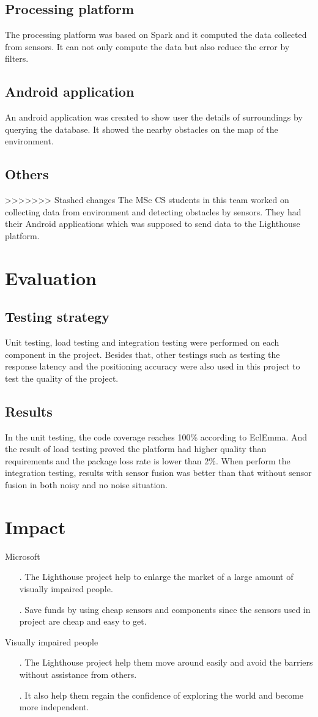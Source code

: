 \documentclass[prodmode,acmtosem]{acmsmall} %
\begin{document}
\subsection{Processing platform}
The processing platform was based on Spark and it computed the data collected from sensors. It can not only compute the data but also reduce the error by filters.
\subsection{Android application}
An android application was created to show user the details of surroundings by querying the database. It showed the nearby obstacles on the map of the environment.
\subsection{Others}
>>>>>>> Stashed changes
The MSc CS students in this team worked on collecting data from environment and detecting obstacles by sensors. They had their Android applications which was supposed to send data to the Lighthouse platform.
\section{Evaluation}
\subsection{Testing strategy}
Unit testing, load testing and integration testing were performed on each component in the project. Besides that, other testings such as testing the response latency and the positioning accuracy were also used in this project to test the quality of the project.
\subsection{Results}
In the unit testing, the code coverage reaches 100\% according to EclEmma. And the result of load testing proved the platform had higher quality than requirements and the package loss rate is lower than 2\%. When perform the integration testing, results with sensor fusion was better than that without sensor fusion in both noisy and no noise situation.
\section{Impact}
Microsoft
\begin{itemize}
\item[.] The Lighthouse project help to enlarge the market of a large amount of visually impaired people.
\item[.] Save funds by using cheap sensors and components since the sensors used in project are cheap and easy to get.
\end{itemize}
Visually impaired people
\begin{itemize}
\item[.] The Lighthouse project help them move around easily and avoid the barriers without assistance from others.
\item[.] It also help them regain the confidence of exploring the world and become more independent.
\end{itemize}
\end{document}

